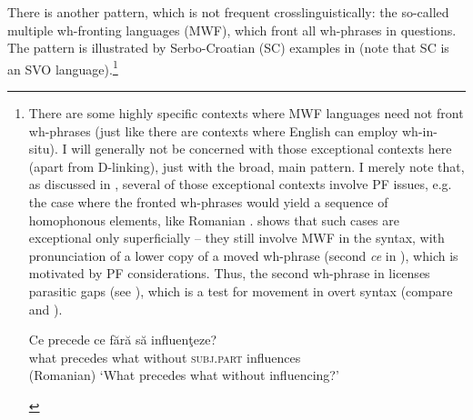 \documentclass[output=paper,colorlinks,citecolor=brown]{langscibook}
\begin{document}
\noindent There is another pattern, which is not frequent crosslinguistically: the so-called multiple wh-fronting languages (MWF), which front all wh-phrases in questions. The pattern is illustrated by Serbo-Croatian (SC) examples in  (note that SC is an SVO language).\footnote{There are some highly specific contexts where MWF languages need not front wh-phrases (just like there are contexts where English can employ wh-in-situ). I will generally not be concerned with those exceptional contexts here (apart from D-linking), just with the broad, main pattern. I merely note that, as discussed in \citet{Bošković2002}, several of those exceptional contexts involve PF issues, e.g. the case where the fronted wh-phrases would yield a sequence of homophonous elements, like Romanian . \citet{Bošković2002} shows that such cases are exceptional only superficially -- they still involve MWF in the syntax, with pronunciation of a lower copy of a moved wh-phrase (second \textit{ce} in ), which is motivated by PF considerations. Thus, the second wh-phrase in  licenses parasitic gaps (see ), which is a test for movement in overt syntax (compare  and ).

\ea\label{ex:bosk:i} 
\label{ex:bosk:ia} 
\label{ex:bosk:ib}
\z\z

\ea \gll Ce    precede   ce     fără       să influenţeze?\\
what precedes what without \textsc{subj.part} influences\\\hfill (Romanian)
\glt `What precedes what without influencing?'\label{ex:bosk:ii}
\z 

\ea\label{ex:bosk:iii} 
\label{ex:bosk:iiia}
\label{ex:bosk:iiib}
\z\z

}

\ea\label{ex:bosk:3} 
\label{ex:bosk:3a}
\label{ex:bosk:3b}
\z\z
\end{document}
